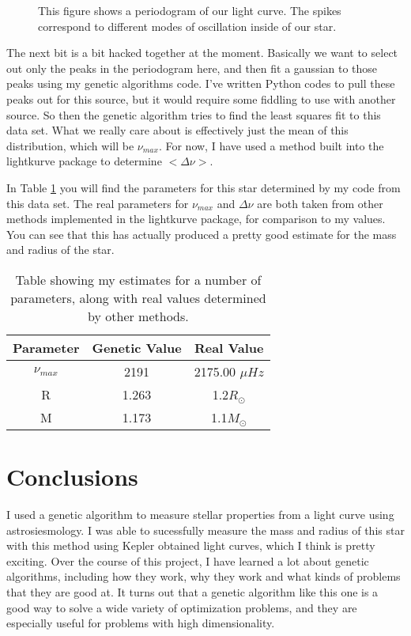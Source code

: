 \documentclass[twocolumn]{aastex63}
\begin{document}
\begin{figure}
  \caption{This figure shows a periodogram of our light curve. The spikes correspond to different modes of oscillation inside of our star.} \label{periodogram}
\end{figure}

The next bit is a bit hacked together at the moment. Basically we want to select out only the peaks in the periodogram here, and then fit a gaussian to those peaks using my genetic algorithms code. I've written Python codes to pull these peaks out for this source, but it would require some fiddling to use with another source. So then the genetic algorithm tries to find the least squares fit to this data set. What we really care about is effectively just the mean of this distribution, which will be $\nu_{max}$. For now, I have used a method built into the lightkurve package to determine $<\Delta \nu>$.

In Table \ref{params} you will find the parameters for this star determined by my code from this data set. The real parameters for $\nu_{max}$ and $\Delta \nu$ are both taken from other methods implemented in the lightkurve package, for comparison to my values.
You can see that this has actually produced a pretty good estimate for the mass and radius of the star.\\

\begin{table}
\begin{center}
\caption{Table showing my estimates for a number of parameters, along with real values determined by other methods.}\label{params}
\begin{tabular}{|c|c|c|}
\hline
Parameter & Genetic Value & Real Value\\
\hline
$\nu_{max}$ & 2191 & 2175.00 $\mu Hz$\\
\hline
R & 1.263& 1.2$ R_\odot$\\
\hline
M & 1.173 & 1.1$ M_\odot$\\
\hline
\end{tabular}
\end{center}
\end{table}

\section{Conclusions}

I used a genetic algorithm to measure stellar properties from a light curve using astrosiesmology. I was able to sucessfully measure the mass and radius of this star with this method using Kepler obtained light curves, which I think is pretty exciting. Over the course of this project, I have learned a lot about genetic algorithms, including how they work, why they work and what kinds of problems that they are good at. It turns out that a genetic algorithm like this one is a good way to solve a wide variety of optimization problems, and they are especially useful for problems with high dimensionality.\\
\end{document}
